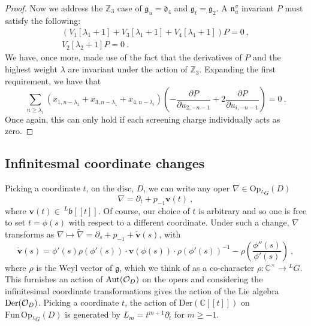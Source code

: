 \documentclass[a4paper]{article}
\def\IC{\mathbb{C}}
\def\IZ{\mathbb{Z}}
\def\OO{{\cal O}}
\def\df{\mathfrak{d}}
\def\gf{\mathfrak{g}}
\begin{document}
\begin{proof}
Now we address the $\IZ_3$ case of $\gf_u=\df_4$ and $\gf_t=\gf_2$. A $\mathfrak{n}_u^\sigma$ invariant $P$ must satisfy the following:
\begin{equation}
	\begin{split}
	(V_{1}[\lambda_1+1] + V_{3}[\lambda_1+1]+V_4[\lambda_1+1])P=0~,\\
	V_{2}[\lambda_2+1]P=0~.
	\end{split}
\end{equation}
We have, once more, made use of the fact that the derivatives of $P$ and the highest weight $\lambda$ are invariant under the action of $\IZ_3$. Expanding the first requirement, we have that
\begin{equation}
	\sum_{n\ge\lambda_1} \left(x_{1,n-\lambda_1}+ x_{3,n-\lambda_1}+x_{4,n-\lambda_i}\right) \left( -\frac{\partial P}{\partial u_{2,-n-1}} + 2 \frac{\partial P}{\partial u_{i,-n-1}} \right) =0~.
\end{equation}
Once again, this can only hold if each screening charge individually acts as zero.
\end{proof}

\subsection{Infinitesmal coordinate changes}

Picking a coordinate $t$, on the disc, $D$, we can write any oper $\nabla\in\mathrm{Op}_{^L G}(D)$
\begin{equation}
	\nabla = \partial_t + p_{-1} \mathbf{v}(t)~,
\end{equation}
where $\mathbf{v}(t)\in\ ^L\mathfrak{b}[[t]]$. Of course, our choice of $t$ is arbitrary and so one is free to set $t=\phi(s)$ with respect to a different coordinate. Under such a change, $\nabla$ transforms as $\nabla \mapsto \widetilde{\nabla} = \partial_s + p_{-1}+ \widetilde{\mathbf{v}}(s)$, with~\cite{Frenkel:2007}
\begin{equation}
	\widetilde{\mathbf{v}}(s) = \phi'(s){\rho}(\phi'(s))\cdot \mathbf{v}(\phi(s))\cdot {\rho}(\phi'(s))^{-1} -\rho\left(\frac{\phi''(s)}{\phi'(s)}\right)~,
\end{equation}
where $\rho$ is the Weyl vector of $\gf$, which we think of as a co-character $\rho:\IC^\times \longrightarrow\! ^LG$. This furnishes an action of $\mathrm{Aut}(\OO_D)$ on the opers and considering the infinitesimal coordinate transformations gives the action of the Lie algebra $\mathrm{Der}(\OO_{D})$. Picking a coordinate $t$, the action of $\mathrm{Der}(\IC[[t]])$ on $\mathrm{Fun}\, \mathrm{Op}_{^L G}(D)$ is generated by $L_m = t^{m+1}\partial_t$ for $m\ge-1$.
\end{document}
